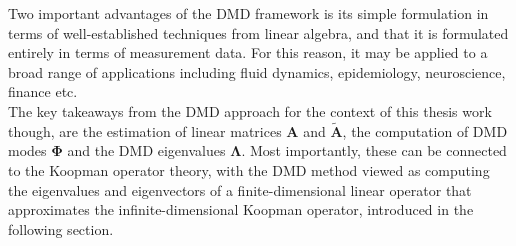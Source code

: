 % 
Two important advantages of the DMD framework is its simple formulation in terms of well-established techniques from linear algebra, and that it is formulated entirely in terms of measurement data. For this reason, it may be applied to a broad range of applications including fluid dynamics, epidemiology, neuroscience, finance etc. \\
The key takeaways from the DMD approach for the context of this thesis work though, are the estimation of linear matrices $\mathbf{A}$ and $\mathbf{\tilde{A}}$, the computation of DMD modes $\mathbf{\Phi}$ and the DMD eigenvalues $\mathbf{\Lambda}$. Most importantly, these can be connected to the Koopman operator theory, with the DMD method viewed as computing the eigenvalues and eigenvectors of a finite-dimensional linear operator that approximates the infinite-dimensional Koopman operator, introduced in the following section.
\newpage
